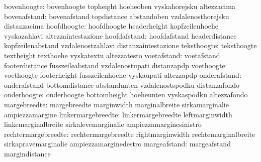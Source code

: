                      bovenhoogte: bovenhoogte                      topheight
                                  hoeheoben                        vyskahorejsku
                                  altezzacima
                    bovenafstand: bovenafstand                     topdistance
                                  abstandoben                      vzdalenosthorejsku
                                  distanzacima
                     hoofdhoogte: hoofdhoogte                      headerheight
                                  kopfzeilenhoehe                  vyskazahlavi
                                  altezzaintestazione
                    hoofdafstand: hoofdafstand                     headerdistance
                                  kopfzeilenabstand                vzdalenostzahlavi
                                  distanzaintestazione
                     teksthoogte: teksthoogte                      textheight
                                  texthoehe                        vyskatextu
                                  altezzatesto
                     voetafstand: voetafstand                      footerdistance
                                  fusszeileabstand                 vzdalenostupati
                                  distanzapdp
                      voethoogte: voethoogte                       footerheight
                                  fusszeilenhoehe                  vyskaupati
                                  altezzapdp
                    onderafstand: onderafstand                     bottomdistance
                                  abstandunten                     vzdalenostspodku
                                  distanzafondo
                     onderhoogte: onderhoogte                      bottomheight
                                  hoeheunten                       vyskaspodku
                                  altezzafondo
                    margebreedte: margebreedte                     marginwidth
                                  marginalbreite                   sirkamarginalie
                                  ampiezzamargine                  %
              linkermargebreedte: linkermargebreedte               leftmarginwidth
                                  linkemarginalbreite              sirkalevemarginalie
                                  ampiezzamarginesinistro
             rechtermargebreedte: rechtermargebreedte              rightmarginwidth
                                  rechtemarginalbreite             sirkapravemarginalie
                                  ampiezzamarginedestro
                    margeafstand: margeafstand                     margindistance
